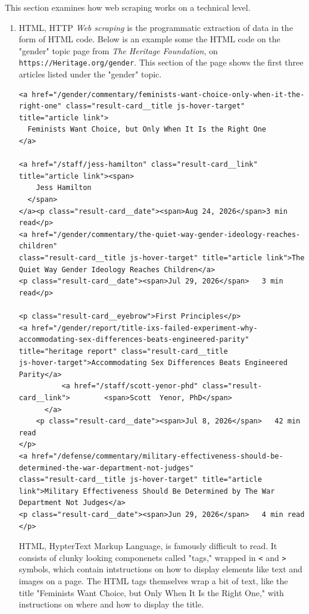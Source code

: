 \documentclass[11pt]{article}
\begin{document}
This section examines how web scraping works on a technical level.

\begin{enumerate}
\item HTML, HTTP
\label{sec:orgbc389ef}
\emph{Web scraping} is the programmatic extraction of data in the form of
HTML code. Below is an example some the HTML code on the "gender"
topic page from \emph{The Heritage Foundation}, on
\texttt{https://Heritage.org/gender}. This section of the page shows the
first three articles listed under the "gender" topic.
\begin{verbatim}
<a href="/gender/commentary/feminists-want-choice-only-when-it-the-right-one" class="result-card__title js-hover-target" title="article link">
  Feminists Want Choice, but Only When It Is the Right One
</a>

<a href="/staff/jess-hamilton" class="result-card__link" title="article link"><span>
    Jess Hamilton
  </span>
</a><p class="result-card__date"><span>Aug 24, 2026</span>3 min
read</p>
<a href="/gender/commentary/the-quiet-way-gender-ideology-reaches-children"
class="result-card__title js-hover-target" title="article link">The
Quiet Way Gender Ideology Reaches Children</a>
<p class="result-card__date"><span>Jul 29, 2026</span>   3 min read</p>

<p class="result-card__eyebrow">First Principles</p>
<a href="/gender/report/title-ixs-failed-experiment-why-accommodating-sex-differences-beats-engineered-parity"
title="heritage report" class="result-card__title
js-hover-target">Accommodating Sex Differences Beats Engineered
Parity</a>
          <a href="/staff/scott-yenor-phd" class="result-card__link">        <span>Scott  Yenor, PhD</span>
      </a>                      
    <p class="result-card__date"><span>Jul 8, 2026</span>   42 min read
</p>
<a href="/defense/commentary/military-effectiveness-should-be-determined-the-war-department-not-judges"
class="result-card__title js-hover-target" title="article
link">Military Effectiveness Should Be Determined by The War
Department Not Judges</a>
<p class="result-card__date"><span>Jun 29, 2026</span>   4 min read </p>
\end{verbatim}
HTML, HypterText Markup Language, is famously difficult to read. It
consists of clunky looking componenets called "tags," wrapped in \texttt{<}
and \texttt{>} symbols, which contain intstructions on how to display
elements like text and images on a page. The HTML tags themselves wrap
a bit of text, like the title "Feminists Want Choice, but Only When It
Is the Right One," with instructions on where and how to display the
title.


\end{enumerate}
\end{document}
